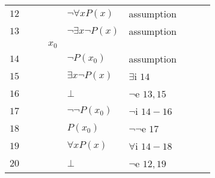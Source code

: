\documentclass[a4paper,12pt]{article}
\begin{document}
\begin{tcolorbox}
\begin{tabular}{l l l l l l l l l}
    $12$  & \multicolumn{1}{|l}{} & & & $\neg \forall x P(x)$ & assumption & & & \multicolumn{1}{l|}{} \\ \cline{3-8}
    
    $13$  & \multicolumn{1}{|l}{} & \multicolumn{1}{|l}{} & & $\neg \exists x \neg P(x)$ & assumption & & \multicolumn{1}{l|}{} & \multicolumn{1}{l|}{} \\ \cline{4-7}
    
         & \multicolumn{1}{|l}{} & \multicolumn{1}{|l}{} & \multicolumn{1}{|l}{$x_0$} & & & \multicolumn{1}{l|}{} & \multicolumn{1}{l|}{} & \multicolumn{1}{l|}{} \\ \cline{5-6}
    
    $14$  & \multicolumn{1}{|l}{} & \multicolumn{1}{|l}{} & \multicolumn{1}{|l}{} & \multicolumn{1}{|l}{$\neg P(x_0)$} & \multicolumn{1}{l|}{assumption} & \multicolumn{1}{l|}{} & \multicolumn{1}{l|}{} & \multicolumn{1}{l|}{} \\
    
    $15$  & \multicolumn{1}{|l}{} & \multicolumn{1}{|l}{} & \multicolumn{1}{|l}{} & \multicolumn{1}{|l}{$\exists x \neg P(x)$} & \multicolumn{1}{l|}{$\exists$i $14$} & \multicolumn{1}{l|}{} & \multicolumn{1}{l|}{} & \multicolumn{1}{l|}{} \\
    
    $16$  & \multicolumn{1}{|l}{} & \multicolumn{1}{|l}{} & \multicolumn{1}{|l}{} & \multicolumn{1}{|l}{$\bot$} & \multicolumn{1}{l|}{$\neg$e $13,15$} & \multicolumn{1}{l|}{} & \multicolumn{1}{l|}{} & \multicolumn{1}{l|}{} \\ \cline{5-6}
    
    $17$  & \multicolumn{1}{|l}{} & \multicolumn{1}{|l}{} & \multicolumn{1}{|l}{} & $\neg \neg P(x_0)$ & $\neg$i $14-16$ & \multicolumn{1}{l|}{} & \multicolumn{1}{l|}{} & \multicolumn{1}{l|}{} \\
    
    $18$  & \multicolumn{1}{|l}{} & \multicolumn{1}{|l}{} & \multicolumn{1}{|l}{} & $P(x_0)$ & $\neg \neg$e $17$ & \multicolumn{1}{l|}{} & \multicolumn{1}{l|}{} & \multicolumn{1}{l|}{} \\ \cline{4-7}
    
    $19$  & \multicolumn{1}{|l}{} & \multicolumn{1}{|l}{} & & $\forall x P(x)$ & $\forall$i $14-18$ & & \multicolumn{1}{l|}{} & \multicolumn{1}{l|}{} \\
    
    $20$  & \multicolumn{1}{|l}{} & \multicolumn{1}{|l}{} & & $\bot$ & $\neg$e $12,19$ & & \multicolumn{1}{l|}{} & \multicolumn{1}{l|}{} \\ \cline{3-8}
    

\end{tabular}
\end{tcolorbox}
\end{document}
